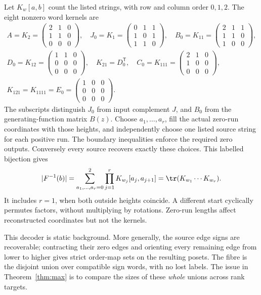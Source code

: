 Let $K_w[a,b]$ count the listed strings, with row and column order
$0,1,2$. The eight nonzero word kernels are
\begin{gather*}
 A=K_2=\begin{pmatrix}2&1&0\\1&1&0\\0&0&0\end{pmatrix},\quad
 J_0=K_1=\begin{pmatrix}0&1&1\\1&0&1\\1&1&0\end{pmatrix},\quad
 B_0=K_{11}=\begin{pmatrix}2&1&1\\1&1&0\\1&0&0\end{pmatrix},\\
 D_0=K_{12}=\begin{pmatrix}1&1&0\\0&0&0\\0&0&0\end{pmatrix},\quad
 K_{21}=D_0^{\mathsf T},\quad
 C_0=K_{111}=\begin{pmatrix}2&1&0\\1&0&0\\0&0&0\end{pmatrix},\\
 K_{121}=K_{1111}=E_0=\begin{pmatrix}1&0&0\\0&0&0\\0&0&0\end{pmatrix}.
\end{gather*}
The subscripts distinguish $J_0$ from input complement $J$, and $B_0$
from the generating-function matrix $B(z)$. Choose $a_1,\ldots,a_r$,
fill the actual zero-run coordinates with those heights, and independently
choose one listed source string for each positive run. The boundary
inequalities enforce the required zero outputs. Conversely every source
recovers exactly these choices. This labelled bijection gives
\begin{equation}\label{eq:fibretrace}
 |F^{-1}(b)|=\sum_{a_1,\ldots,a_r=0}^2
 \prod_{j=1}^r K_{w_j}[a_j,a_{j+1}]
 =\tr(K_{w_1}\cdots K_{w_r}).
\end{equation}
It includes $r=1$, when both outside heights coincide. A different
start cyclically permutes factors, without multiplying by rotations.
Zero-run lengths affect reconstructed coordinates but not the kernels.

This decoder is static background. More generally, the source edge signs
are recoverable; contracting their zero edges and orienting every
remaining edge from lower to higher gives strict order-map sets on the
resulting posets. The fibre is the disjoint union over compatible sign
words, with no lost labels. The issue in Theorem~\ref{thm:max} is to
compare the sizes of these \emph{whole} unions across rank targets.


